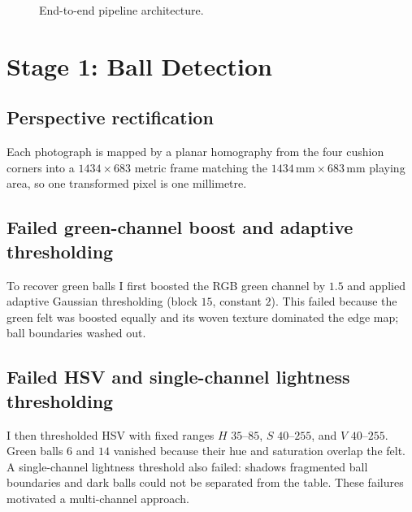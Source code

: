 \documentclass[12pt,a4paper]{article}
\begin{document}
\begin{figure}[htbp]
{}
\caption{End-to-end pipeline architecture.}
\label{fig:pipeline}
\end{figure}
\vspace{-4pt}

\section{Stage 1: Ball Detection}

\subsection{Perspective rectification}

Each photograph is mapped by a planar homography from the four cushion corners into a $1434\times683$ metric frame matching the $1434\,\mathrm{mm}\times683\,\mathrm{mm}$ playing area, so one transformed pixel is one millimetre.

\subsection{Failed green-channel boost and adaptive thresholding}

To recover green balls I first boosted the RGB green channel by $1.5$ and applied adaptive Gaussian thresholding (block $15$, constant $2$). This failed because the green felt was boosted equally and its woven texture dominated the edge map; ball boundaries washed out.

\subsection{Failed HSV and single-channel lightness thresholding}

I then thresholded HSV with fixed ranges $H$ $35$--$85$, $S$ $40$--$255$, and $V$ $40$--$255$. Green balls $6$ and $14$ vanished because their hue and saturation overlap the felt. A single-channel lightness threshold also failed: shadows fragmented ball boundaries and dark balls could not be separated from the table. These failures motivated a multi-channel approach.
\end{document}
